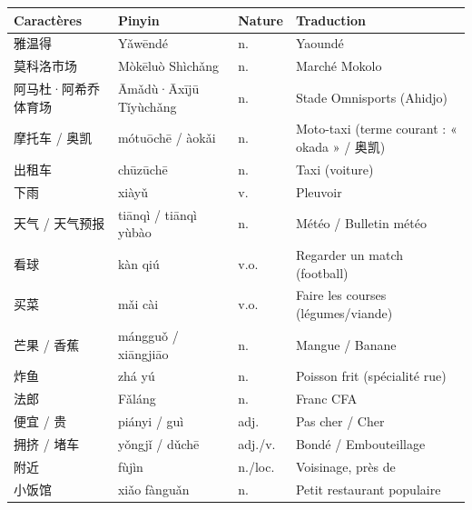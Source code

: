 \documentclass[11pt]{article}
\begin{document}
\begin{definition}
\begin{center}
\begin{tabularx}{\linewidth}{|X|X|X|X|}
\hline
\rowcolor{popblueL} \textbf{Caractères} & \textbf{Pinyin} & \textbf{Nature} & \textbf{Traduction} \\
\hline
雅温得 & Yǎwēndé & n. & Yaoundé \\
莫科洛市场 & Mòkēluò Shìchǎng & n. & Marché Mokolo \\
阿马杜·阿希乔体育场 & Āmǎdù·Āxījū Tǐyùchǎng & n. & Stade Omnisports (Ahidjo) \\
摩托车 / 奥凯 & mótuōchē / àokǎi & n. & Moto-taxi (terme courant : « okada » / 奥凯) \\
出租车 & chūzūchē & n. & Taxi (voiture) \\
下雨 & xiàyǔ & v. & Pleuvoir \\
天气 / 天气预报 & tiānqì / tiānqì yùbào & n. & Météo / Bulletin météo \\
看球 & kàn qiú & v.o. & Regarder un match (football) \\
买菜 & mǎi cài & v.o. & Faire les courses (légumes/viande) \\
芒果 / 香蕉 & mángguǒ / xiāngjiāo & n. & Mangue / Banane \\
炸鱼 & zhá yú & n. & Poisson frit (spécialité rue) \\
法郎 & Fǎláng & n. & Franc CFA \\
便宜 / 贵 & piányi / guì & adj. & Pas cher / Cher \\
拥挤 / 堵车 & yǒngjǐ / dǔchē & adj./v. & Bondé / Embouteillage \\
附近 & fùjìn & n./loc. & Voisinage, près de \\
小饭馆 & xiǎo fànguǎn & n. & Petit restaurant populaire \\
\hline
\end{tabularx}
\end{center}
\end{definition}
\end{document}
